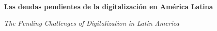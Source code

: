 \documentclass{article}
\renewcommand{\normalsize}{\fontsize{10pt}{13pt}\selectfont}
\newcommand{\articulotipo}{}
\newcommand{\articulotitulo}{}
\newcommand{\articulotitulotrans}{}
\newcommand{\articuloautores}{}
\newcommand{\articulodoi}{}
\newcommand{\articuloidiomaxml}{es}
\newcommand{\articulorevista}{}
\newcommand{\articuloissne}{}
\newcommand{\articulovolumen}{}
\newcommand{\articulonumero}{}
\newcommand{\articulofecha}{}
\newcommand{\articulopagina}{0}
\begin{document}

\renewcommand{\articuloidiomaxml}{es}
\renewcommand{\articulotitulo}{Las deudas pendientes de la digitalización en América Latina}
\renewcommand{\articuloautores}{Andrea Esther Liberatore}
\renewcommand{\articulodoi}{10.1787/7a127615-es}
\renewcommand{\articulotipo}{EDITORIAL}
\renewcommand{\articulorevista}{Agenda Digital Latinoamericana}
\renewcommand{\articuloissne}{1853-0028}
\renewcommand{\articulovolumen}{01}
\renewcommand{\articulonumero}{01}
\renewcommand{\articulofecha}{ 2026}
\renewcommand{\articulopagina}{1}

\setcounter{page}{1}
\thispagestyle{firstpage}

\noindent\begin{minipage}[t]{\dimexpr\textwidth+\marginparsep+\marginparwidth\relax}%
{\sffamily\bfseries\Large\articulotitulo\par}%
\end{minipage}\par
\vspace{3mm}%
\renewcommand{\articulotitulotrans}{The Pending Challenges of Digitalization in Latin America}
\noindent\begin{minipage}[t]{\dimexpr\textwidth+\marginparsep+\marginparwidth\relax}%
{\sffamily\itshape\normalsize\articulotitulotrans\par}%
\end{minipage}\par
\vspace{4mm}%
\end{document}
